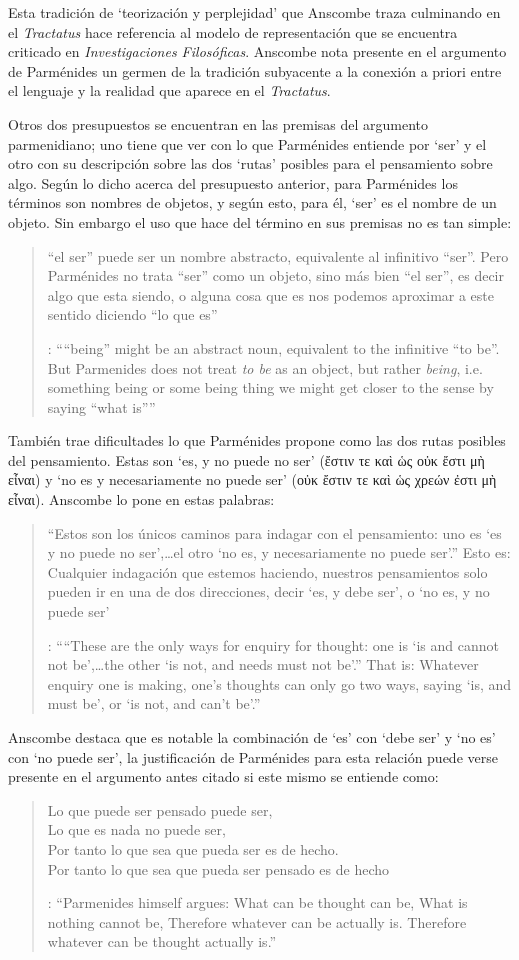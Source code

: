 Esta tradición de \enquote*{teorización y perplejidad} que Anscombe traza culminando en el \emph{Tractatus} hace referencia al modelo de representación que se encuentra criticado en \emph{Investigaciones Filosóficas}. Anscombe nota presente en el argumento de Parménides un germen de la tradición subyacente a la conexión a priori entre el lenguaje y la realidad que aparece en el \emph{Tractatus}.

Otros dos presupuestos se encuentran en las premisas del argumento parmenidiano; uno tiene que ver con lo que Parménides entiende por `ser' y el otro con su descripción sobre las dos `rutas' posibles para el pensamiento sobre algo. Según lo dicho acerca del presupuesto anterior, para Parménides los términos son nombres de objetos, y según esto, para él, `ser' es el nombre de un objeto. Sin embargo el uso que hace del término en sus premisas no es tan simple: \blockquote[{\cite[x]{anscombe1981parmenides}}: \enquote{``being'' might be an abstract noun, equivalent to the infinitive ``to be''. But Parmenides does not treat \emph{to be} as an object, but rather \emph{being}, i.e. something being or some being thing \textelp{} we might get closer to the sense by saying ``what is''}]{``el ser'' puede ser un nombre abstracto, equivalente al infinitivo ``ser''. Pero Parménides no trata ``ser'' como un objeto, sino más bien ``el ser'', es decir algo que esta siendo, o alguna cosa que es \textelp{} nos podemos aproximar a este sentido diciendo ``lo que es''}. También trae dificultades lo que Parménides propone como las dos rutas posibles del pensamiento. Estas son \enquote*{es, y no puede no ser} (\textgreek{ἔστιν τε καὶ ὡς οὐκ ἔστι μὴ εἶναι}) y \enquote*{no es y necesariamente no puede ser} (\textgreek{οὐκ ἔστιν τε καὶ ὡς χρεών ἐστι μὴ εἶναι}). Anscombe lo pone en estas palabras: \blockquote[{\cite[x]{anscombe1981parmenides}}: \enquote{``These are the only ways for enquiry for thought: one is `is and cannot not be',\ldots the other `is not, and needs must not be'.'' That is: Whatever enquiry one is making, one's thoughts can only go two ways, saying `is, and must be', or `is not, and can't be'.}]{``Estos son los únicos caminos para indagar con el pensamiento: uno es `es y no puede no ser',\ldots el otro `no es, y necesariamente no puede ser'.'' Esto es: Cualquier indagación que estemos haciendo, nuestros pensamientos solo pueden ir en una de dos direcciones, decir `es, y debe ser', o `no es, y no puede ser'}. Anscombe destaca que es notable la combinación de `es' con `debe ser'  y `no es' con `no puede ser', la justificación de Parménides para esta relación puede verse presente en el argumento antes citado si este mismo se entiende como: \blockquote[{\cite[vii]{anscombe1981parmenides}}: \enquote{Parmenides himself argues: What can be thought can be, What is nothing cannot be, Therefore whatever can be actually is. Therefore whatever can be thought actually is.}]{Lo que puede ser pensado puede ser,\\
Lo que es nada no puede ser,\\
Por tanto lo que sea que pueda ser es de hecho.\\
Por tanto lo que sea que pueda ser pensado es de hecho}.

